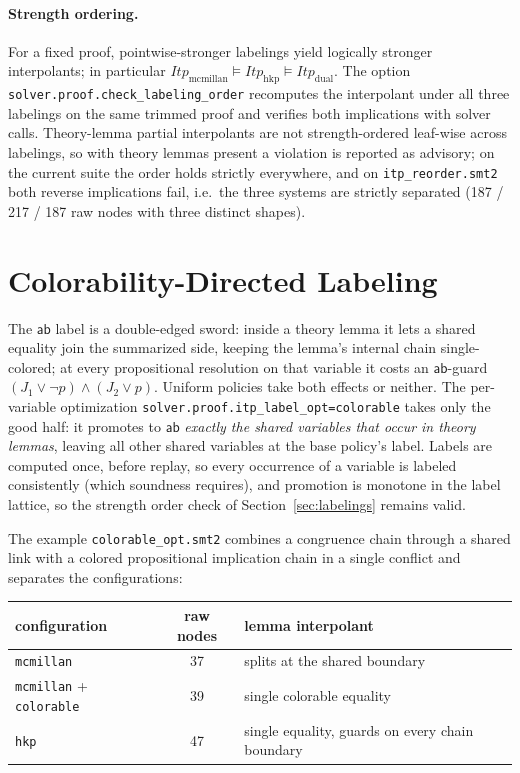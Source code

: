 \documentclass[11pt]{article}
\newcommand{\Itp}{\mathit{Itp}}
\newcommand{\lblab}{\mathsf{ab}}
\newcommand{\opt}[1]{\texttt{#1}}
\newcommand{\code}[1]{\texttt{#1}}
\begin{document}
\paragraph{Strength ordering.}
For a fixed proof, pointwise-stronger labelings yield logically stronger
interpolants; in particular
$\Itp_{\text{mcmillan}} \models \Itp_{\text{hkp}} \models
\Itp_{\text{dual}}$. The option \opt{solver.proof.check\_labeling\_order}
recomputes the interpolant under all three labelings on the same trimmed
proof and verifies both implications with solver calls. Theory-lemma
partial interpolants are not strength-ordered leaf-wise across labelings,
so with theory lemmas present a violation is reported as advisory; on the
current suite the order holds strictly everywhere, and on
\code{itp\_reorder.smt2} both reverse implications fail, i.e.\ the three
systems are strictly separated (187 / 217 / 187 raw nodes with three
distinct shapes).

\section{Colorability-Directed Labeling}
\label{sec:labelopt}

The $\lblab$ label is a double-edged sword: inside a theory lemma it lets a
shared equality join the summarized side, keeping the lemma's internal chain
single-colored; at every propositional resolution on that variable it costs
an $\lblab$-guard $(J_1 \vee \neg p) \wedge (J_2 \vee p)$. Uniform policies
take both effects or neither. The per-variable optimization
\opt{solver.proof.itp\_label\_opt=colorable} takes only the good half: it
promotes to $\lblab$ \emph{exactly the shared variables that occur in theory
lemmas}, leaving all other shared variables at the base policy's label.
Labels are computed once, before replay, so every occurrence of a variable
is labeled consistently (which soundness requires), and promotion is
monotone in the label lattice, so the strength order check of
Section~\ref{sec:labelings} remains valid.

The example \code{colorable\_opt.smt2} combines a congruence chain through a
shared link with a colored propositional implication chain in a single
conflict and separates the configurations:

\begin{center}
\begin{tabular}{lcl}
\toprule
configuration & raw nodes & lemma interpolant \\
\midrule
\opt{mcmillan} & 37 & splits at the shared boundary \\
\opt{mcmillan} + \opt{colorable} & 39 & single colorable equality \\
\opt{hkp} & 47 & single equality, guards on every chain boundary \\
\bottomrule
\end{tabular}
\end{center}
\end{document}
